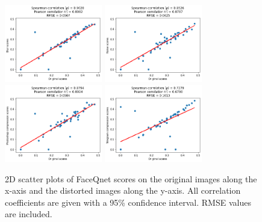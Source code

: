 \begin{figure}[h]
\centering
    \subfloat
        {\includegraphics[width=0.38\textwidth]{figures/FaceQnetBlur.png}}
    \subfloat
        {\includegraphics[width=0.38\textwidth]{figures/FaceQnetNoise.png}}
        \quad
    \subfloat
        {\includegraphics[width=0.38\textwidth]{figures/FaceQnetPhotoshop.png}}
    \subfloat
        {\includegraphics[width=0.38\textwidth]{figures/FaceQnetTelegram.png}}
    \caption{2D scatter plots of FaceQnet scores on the original images along the x-axis and the distorted images along the y-axis. All correlation coefficients are given with a 95\% confidence interval. RMSE values are included.}
    \label{fig:NFCFaceCorr}
\end{figure}

